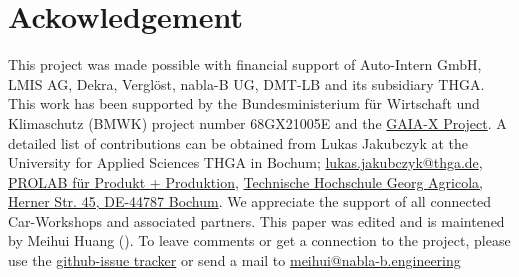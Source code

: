 \documentclass[conference,a4paper]{IEEEtran}
\begin{document}
\section{Ackowledgement}
This project was made possible with financial support of Auto-Intern GmbH, LMIS AG, Dekra, Verglöst, nabla-B UG, DMT-LB and its subsidiary THGA.
This work has been supported by the Bundesministerium für Wirtschaft und Klimaschutz (BMWK) project number 68GX21005E and the \href{https://gaia-x.eu/}{GAIA-X Project}.
A detailed list of contributions can be obtained from Lukas Jakubczyk at the University for Applied Sciences THGA in Bochum; \href{mailto:lukas.jakubczyk@thga.de}{lukas.jakubczyk@thga.de}, \href{https://www.thga.de/forschung/maschinenbau-und-materialwissenschaften/labore/prolab-produkt-produktion}{PROLAB für Produkt + Produktion}, \href{https://maps.app.goo.gl/tQA3Qfn5f6gGqMHg8}{Technische Hochschule Georg Agricola, Herner Str. 45, DE-44787 Bochum}.
We appreciate the support of all connected Car-Workshops and associated partners. 
This paper was edited and is maintened by Meihui Huang (). 
To leave comments or get a connection to the project, please use the \href{https://github.com/nabla-B/paper_aw4null-overview/issues}{github-issue tracker} or send a mail to \href{mailto:meihui@nabla-b.engineering}{meihui@nabla-b.engineering}




\end{document}
